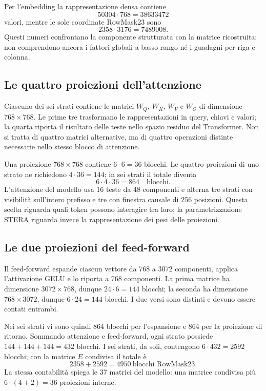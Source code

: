 Per l'embedding la rappresentazione densa contiene
\[
50304\cdot768=\num{38633472}
\]
valori, mentre le sole coordinate RowMask23 sono
\[
2358\cdot3176=\num{7489008}.
\]
Questi numeri confrontano la componente strutturata con la matrice ricostruita: non comprendono ancora i fattori globali a basso rango né i guadagni per riga e colonna.

\subsection{Le quattro proiezioni dell'attenzione}

Ciascuno dei sei strati contiene le matrici $W_Q$, $W_K$, $W_V$ e $W_O$ di dimensione $768\times768$. Le prime tre trasformano le rappresentazioni in query, chiavi e valori; la quarta riporta il risultato delle teste nello spazio residuo del Transformer. Non si tratta di quattro matrici alternative, ma di quattro operazioni distinte necessarie nello stesso blocco di attenzione.

Una proiezione $768\times768$ contiene $6\cdot6=36$ blocchi. Le quattro proiezioni di uno strato ne richiedono $4\cdot36=144$; in sei strati il totale diventa
\[
6\cdot4\cdot36=\num{864}\quad\text{blocchi}.
\]
L'attenzione del modello usa 16 teste da 48 componenti e alterna tre strati con visibilità sull'intero prefisso e tre con finestra causale di 256 posizioni. Questa scelta riguarda quali token possono interagire tra loro; la parametrizzazione STERA riguarda invece la rappresentazione dei pesi delle proiezioni.

\subsection{Le due proiezioni del feed-forward}

Il feed-forward espande ciascun vettore da 768 a 3072 componenti, applica l'attivazione GELU e lo riporta a 768 componenti. La prima matrice ha dimensione $3072\times768$, dunque $24\cdot6=144$ blocchi; la seconda ha dimensione $768\times3072$, dunque $6\cdot24=144$ blocchi. I due versi sono distinti e devono essere contati entrambi.

Nei sei strati vi sono quindi \num{864} blocchi per l'espansione e \num{864} per la proiezione di ritorno. Sommando attenzione e feed-forward, ogni strato possiede $144+144+144=432$ blocchi. I sei strati, da soli, contengono $6\cdot432=\num{2592}$ blocchi; con la matrice $E$ condivisa il totale è
\[
\num{2358}+\num{2592}=\boxed{\num{4950}\ \text{blocchi RowMask23}}.
\]
La stessa contabilità spiega le 37 matrici del modello: una matrice condivisa più $6\cdot(4+2)=36$ proiezioni interne.

